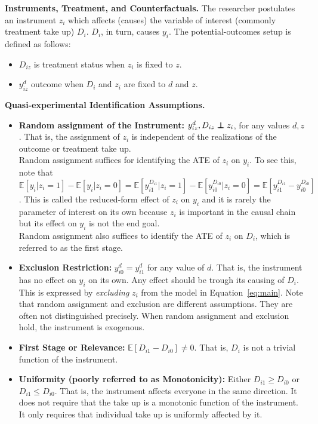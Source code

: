 \noindent \textbf{Instruments, Treatment, and Counterfactuals.} The researcher postulates an instrument $z_{i}$ which affects (causes) the variable of interest (commonly treatment take up) $D_{i}$. $D_{i}$, in turn, causes $y_{i}$. The potential-outcomes setup is defined as follows: 
\begin{itemize}
\item $D_{iz}$ is treatment status when $z_{i}$ is fixed to $z$. 
\item $y_{iz}^d$ outcome when $D_i$ and  $z_{i}$ are fixed to $d$ and $z$.  
\end{itemize}
\bigskip
\noindent \textbf{Quasi-experimental Identification Assumptions.} 
\begin{itemize}
\item \textbf{Random assignment of the Instrument:} $y_{iz}^d, D_{iz}  \independent z_{i}$, for any values $d,z$. That is, the assignment of $z_{i}$ is independent of the realizations of the outcome or treatment take up.\\

\noindent Random assignment suffices for identifying the ATE of $z_{i}$ on $y_{i}$. To see this, note that $\mathbb{E} \left[ y_{i} | z_{i} = 1 \right] - \mathbb{E} \left[ y_{i} | z_{i} = 0 \right] = \mathbb{E} \left[ y_{i1}^{D_{i1}} | z_{i} = 1 \right] - \mathbb{E} \left[ y_{i0}^{D_{i0}} | z_{i} = 0 \right] = \mathbb{E} \left[ y_{i1}^{D_{i1}} - y_{i0}^{D_{i0}} \right]$. This is called the reduced-form effect of $z_{i}$ on $y_{i}$ and it is rarely the parameter of interest on its own because $z_{i}$ is important in the causal chain but its effect on $y_{i}$ is not the end goal.\\ 

\noindent Random assignment also suffices to identify the ATE of $z_{i}$ on $D_{i}$, which is referred to as the first stage.

\item  \textbf{Exclusion Restriction:} $y_{i0}^d = y_{i1}^d$ for any value of $d$. That is, the instrument has no effect on $y_{i}$ on its own. Any effect should be trough its causing of $D_{i}$. This is expressed by \textit{excluding} $z_{i}$ from the model in Equation~\eqref{eq:main}. 
Note that random assignment and exclusion are different assumptions. They are often not distinguished precisely. When random assignment and exclusion hold, the instrument is exogenous. 
\item \textbf{First Stage or Relevance:} $\mathbb{E} \left[ D_{i1} - D_{i0} \right] \neq 0$. That is, $D_{i}$ is not a trivial function of the instrument. 
\item \textbf{Uniformity (poorly referred to as Monotonicity):} Either $D_{i1} \geq D_{i0}$ or $D_{i1} \leq D_{i0}$. That is, the instrument affects everyone in the same direction. It does not require that the take up is a monotonic function of the instrument. It only requires that individual take up is uniformly affected by it. 
\end{itemize}

